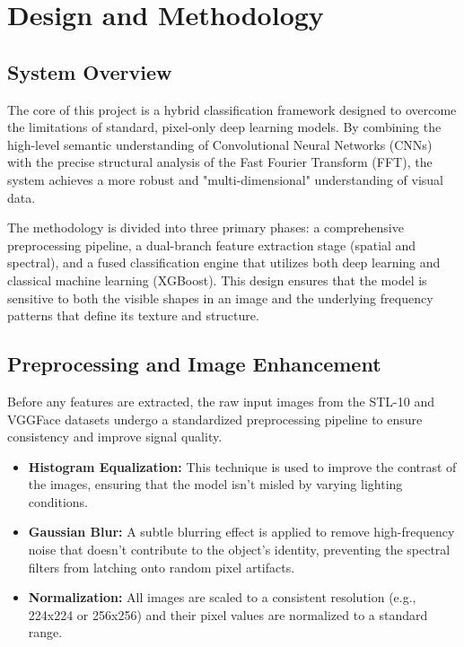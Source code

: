 \chapter{Design and Methodology}
\label{ch:methodology}

\section{System Overview}

The core of this project is a hybrid classification framework designed to overcome the limitations of standard, pixel-only deep learning models. By combining the high-level semantic understanding of Convolutional Neural Networks (CNNs) with the precise structural analysis of the Fast Fourier Transform (FFT), the system achieves a more robust and "multi-dimensional" understanding of visual data. 

The methodology is divided into three primary phases: a comprehensive preprocessing pipeline, a dual-branch feature extraction stage (spatial and spectral), and a fused classification engine that utilizes both deep learning and classical machine learning (XGBoost). This design ensures that the model is sensitive to both the visible shapes in an image and the underlying frequency patterns that define its texture and structure.

\section{Preprocessing and Image Enhancement}

Before any features are extracted, the raw input images from the STL-10 and VGGFace datasets undergo a standardized preprocessing pipeline to ensure consistency and improve signal quality.

\begin{itemize}
    \item \textbf{Histogram Equalization:} This technique is used to improve the contrast of the images, ensuring that the model isn't misled by varying lighting conditions.
    \item \textbf{Gaussian Blur:} A subtle blurring effect is applied to remove high-frequency noise that doesn't contribute to the object's identity, preventing the spectral filters from latching onto random pixel artifacts.
    \item \textbf{Normalization:} All images are scaled to a consistent resolution (e.g., 224x224 or 256x256) and their pixel values are normalized to a standard range.
\end{itemize}

